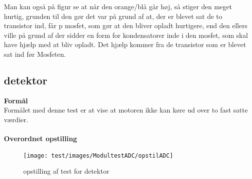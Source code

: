 Man kan også på figur se at når den orange/blå går høj, så stiger den meget hurtig, grunden til den gør det var på grund af at, der er blevet sat de to transistor ind, får p mosfet, som gør at den bliver opladt hurtigere, end den ellers ville på grund af der sidder en form for kondensatorer inde i den mosfet, som skal have hjælp med at bliv opladt. Det hjælp kommer fra de transistor som er blevet sat ind før Mosfeten.  

\subsection{detektor}

\textbf{Formål}
\\ Formålet med denne test er at vise at motoren ikke kan køre ud over to fast satte værdier.\\
\\
\textbf{Overordnet opstilling}
\begin{figure}[H]
	\centering
	\texttt{[image: test/images/ModultestADC/opstilADC]}
	\caption{opstilling af test for detektor}
\end{figure}


